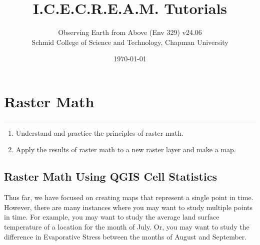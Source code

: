 \documentclass[oneside,a4paper,11pt,explicit]{book}
\title{I.C.E.C.R.E.A.M. Tutorials}
\subtitle{\small Observing Earth from Above (Env 329) v24.06 \\
	\small Schmid College of Science and Technology, Chapman University}
\date{\today}
\begin{document}
\setcounter{tocdepth}{3}
\setcounter{minitocdepth}{3}
\dominitoc

\setcounter{chapter}{12} %

\chapter{Raster Math} %

\vspace{-2em}

\minitoc

\hrule

\vspace{1em}

\begin{tcolorbox}[enhanced,frame style image=blueshade.png,
	opacityback=0.75,opacitybacktitle=0.25,
	colback=blue!5!white,colframe=blue!75!black,title={\Large \textbf{Objectives:}}]
	\large
	\begin{enumerate}
		\item Understand and practice the principles of raster math. 
		\item Apply the results of raster math to a new raster layer and make a map.
	\end{enumerate}
\end{tcolorbox}

\clearpage

\fancyhead{}

\section{Raster Math Using QGIS Cell Statistics}

Thus far, we have focused on creating maps that represent a single point in time. However, there are many instances where you may want to study multiple points in time. For example, you may want to study the average land surface temperature of a location for the month of July. Or, you may want to study the difference in Evaporative Stress between the months of August and September. 
\end{document}
